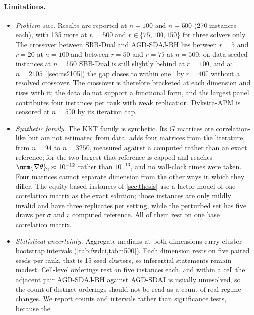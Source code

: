 \paragraph{Limitations.}
\begin{itemize}
  \item \emph{Problem size.} Results are reported at $n=100$ and $n=500$
    (270 instances each), with 135 more at $n=500$ and $r\in\{75,100,150\}$
    for three solvers only. The crossover between SBB-Dual and AGD-SDAJ-BH
    lies between $r=5$ and $r=20$ at $n=100$ and between $r=50$ and $r=75$
    at $n=500$; on data-seeded instances at $n=550$ SBB-Dual is still slightly
    behind at $r=100$, and at $n=2105$ (\cref{sec:us2105}) the gap closes to
    within one \EVD\ by $r=400$ without a resolved crossover. The crossover is
    therefore bracketed at each dimension and rises with it; the data do not
    support a functional form, and the largest panel contributes four
    instances per rank with weak replication.
    Dykstra-APM is censored at $n=500$ by its iteration cap.
  \item \emph{Synthetic family.} The KKT family is synthetic. Its $G$
    matrices are correlation-like but are not estimated from data.
     adds four matrices from the literature, from $n=94$ to
    $n=3250$, measured against a computed rather than an exact reference; for
    the two largest that reference is capped and reaches
    $\nrm{\nabla\theta}_2\approx10^{-12}$ rather than $10^{-13}$, and no
    wall-clock times were taken. Four matrices cannot separate dimension from
    the other ways in which they differ. The equity-based instances of
    \cref{sec:thesis} use a factor model of one correlation matrix as the
    exact solution; those instances are only mildly invalid and have three
    replicates per setting, while the perturbed set has five draws per
    $\sigma$ and a computed reference. All of them rest on one base
    correlation matrix.
  \item \emph{Statistical uncertainty.} Aggregate medians at both dimensions
    carry cluster-bootstrap intervals (\cref{tab:fwdci,tab:n500}). Each
    dimension rests on five paired seeds per rank, that is 15 seed clusters,
    so inferential statements remain modest. Cell-level
    orderings rest on five instances each, and within a cell the adjacent pair
    AGD-SDAJ-BH against AGD-SDAJ is usually unresolved, so the count of
    distinct orderings should not be read as a count of real regime changes.
    We report counts and intervals rather than significance tests, because the

\end{itemize}

